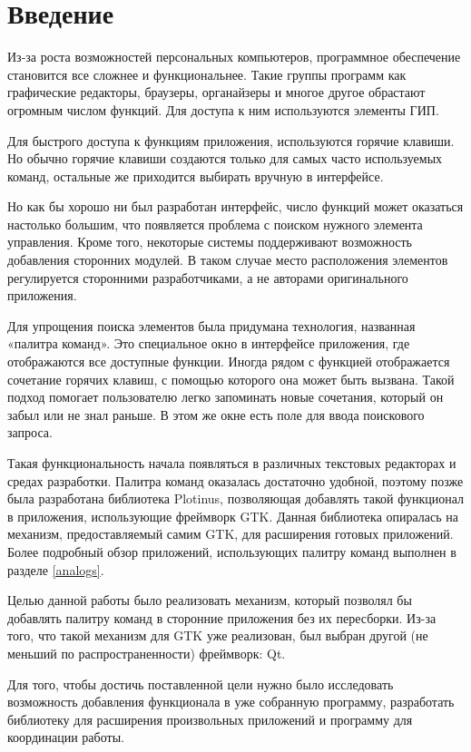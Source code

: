 \chapter*{Введение}

Из-за роста возможностей персональных компьютеров, программное обеспечение
становится все сложнее и функциональнее. Такие группы программ как графические
редакторы, браузеры, органайзеры и многое другое обрастают
огромным числом функций. Для доступа к ним используются элементы ГИП.

Для быстрого доступа к функциям приложения, используются горячие клавиши. Но
обычно горячие клавиши создаются только для самых часто используемых команд,
остальные же приходится выбирать вручную в интерфейсе.

Но как бы хорошо ни был разработан интерфейс, число функций может оказаться
настолько большим, что появляется проблема с поиском нужного элемента
управления. Кроме того, некоторые системы поддерживают возможность добавления
сторонних модулей. В таком случае место расположения элементов регулируется
сторонними разработчиками, а не авторами оригинального приложения.

Для упрощения поиска элементов была придумана технология, названная «палитра
команд». Это специальное окно в интерфейсе приложения, где отображаются все
доступные функции.
Иногда рядом с функцией отображается сочетание горячих клавиш, с помощью
которого она может быть вызвана. Такой подход помогает пользователю легко
запоминать новые сочетания, который он забыл или не знал раньше.
В этом же окне есть поле для ввода поискового запроса.

Такая функциональность начала появляться в различных текстовых редакторах и
средах разработки. Палитра команд оказалась достаточно удобной, поэтому позже
была разработана библиотека Plotinus, позволяющая добавлять такой функционал в
приложения, использующие фреймворк GTK. Данная библиотека опиралась на механизм,
предоставляемый самим GTK, для расширения готовых приложений. Более подробный
обзор приложений, использующих палитру команд выполнен в разделе \ref{analogs}.

Целью данной работы было реализовать механизм, который позволял бы добавлять
палитру команд в сторонние приложения без их пересборки. Из-за того, что такой
механизм для GTK уже реализован, был выбран другой (не меньший по
распространенности) фреймворк: Qt.

Для того, чтобы достичь поставленной цели нужно было исследовать возможность
добавления функционала в уже собранную программу, разработать библиотеку для
расширения произвольных приложений и программу для координации работы.

